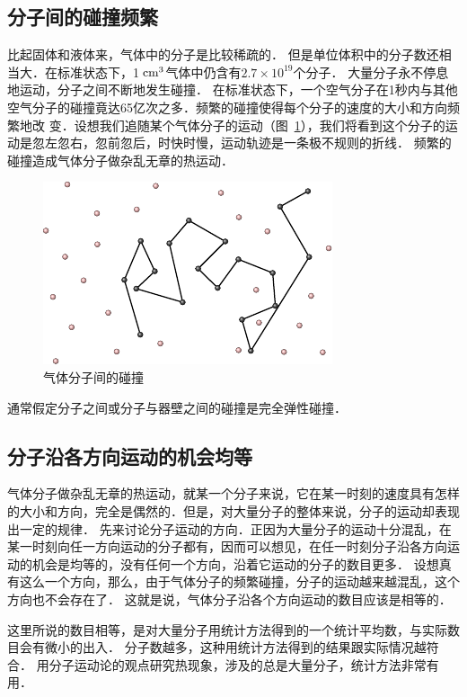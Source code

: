 \subsection{分子间的碰撞频繁} 
比起固体和液体来，气体中的分子是比较稀疏的．
但是单位体积中的分子数还相当大．在标准状态下，1$\;\text{cm}^3$气体中仍含有$2.7\times 10^{19}$个分子．
大量分子永不停息地运动，分子之间不断地发生碰撞．
在标准状态下，一个空气分子在1秒内与其他空气分子的碰撞竟达65亿次之多．频繁的碰撞使得每个分子的速度的大小和方向频繁地改 
变．设想我们追随某个气体分子的运动（图~\ref{fig_B_3-13}），我们将看到这个分子的运动是忽左忽右，忽前忽后，时快时慢，运动轨迹是一条极不规则的折线．
频繁的碰撞造成气体分子做杂乱无章的热运动．
\begin{figure}[htbp]
    \centering
    \includegraphics{fig/B/3-13.pdf}
    \caption{气体分子间的碰撞}\label{fig_B_3-13}
\end{figure}

通常假定分子之间或分子与器壁之间的碰撞是完全弹性碰撞．

\subsection{分子沿各方向运动的机会均等} 

气体分子做杂乱无章的热运动，就某一个分子来说，它在某一时刻的速度具有怎样的大小和方向，完全是偶然的．但是，对大量分子的整体来说，分子的运动却表现出一定的规律．
先来讨论分子运动的方向．正因为大量分子的运动十分混乱，在某一时刻向任一方向运动的分子都有，因而可以想见，在任一时刻分子沿各方向运动的机会是均等的，没有任何一个方向，沿着它运动的分子的数目更多．
设想真有这么一个方向，那么，由于气体分子的频繁碰撞，分子的运动越来越混乱，这个方向也不会存在了．
这就是说，气体分子沿各个方向运动的数目应该是相等的．

这里所说的数目相等，是对大量分子用统计方法得到的一个统计平均数，与实际数目会有微小的出入．
分子数越多，这种用统计方法得到的结果跟实际情况越符合．
用分子运动论的观点研究热现象，涉及的总是大量分子，统计方法非常有用．

